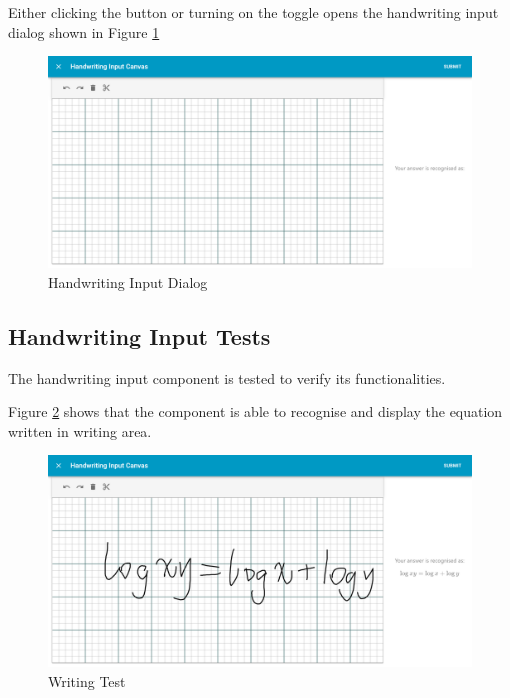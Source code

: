 \documentclass[12pt,twoside]{report}
\begin{document}
Either clicking the button or turning on the toggle opens the handwriting input dialog shown in Figure \ref{fig:handwriting-plain}
\begin{figure}[h]
    \centering
    \includegraphics[width=\linewidth, frame]{figures/handwriting-dialog-plain.png}
    \caption{Handwriting Input Dialog}
    \label{fig:handwriting-plain}
\end{figure}

\subsection*{Handwriting Input Tests}
The handwriting input component is tested to verify its functionalities.

Figure \ref{fig:test-write} shows that the component is able to recognise and display the equation written in writing area.
\begin{figure}[H]
    \centering
    \includegraphics[width=\linewidth, frame]{figures/test-write.png}
    \caption{Writing Test}
    \label{fig:test-write}
\end{figure}
\end{document}
